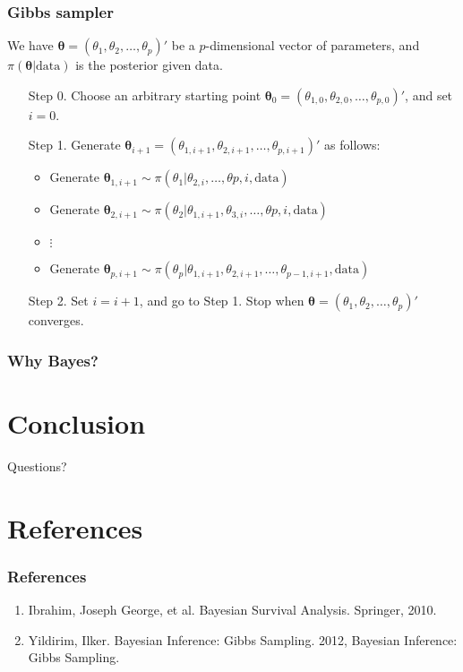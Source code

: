 \documentclass{beamer}
\begin{document}
\begin{frame}
\frametitle{Gibbs sampler}
We have $\pmb{\theta} = (\theta_1, \theta_2, \ldots, \theta_p)'$ be a $p$-dimensional vector of parameters, and $\pi(\pmb{\theta}|\text{data})$ is the posterior given data. 
\begin{enumerate}
\item[Step 0.] Choose an arbitrary starting point $\pmb{\theta}_{0} = (\theta_{1,0}, \theta_{2,0}, \ldots, \theta_{p,0})'$, and set $i = 0$.
\item [Step 1.] Generate $\pmb{\theta}_{i+1} = (\theta_{1,i+1}, \theta_{2,i+1}, \ldots, \theta_{p,i+1})'$ as follows:
	\begin{itemize}
	\item Generate $\pmb{\theta}_{1,i+1} \sim \pi(\theta_1|\theta_{2,i}, \ldots, \theta{p,i},\text{data})$
	\item Generate $\pmb{\theta}_{2,i+1} \sim \pi(\theta_2|\theta_{1,i+1}, \theta_{3,i}, \ldots, \theta{p,i},\text{data})$
	\item $\vdots$
	\item Generate $\pmb{\theta}_{p,i+1} \sim \pi(\theta_p|\theta_{1,i+1}, \theta_{2,i+1}, \ldots, \theta_{p-1,i+1}, \text{data})$
	\end{itemize}
\item [Step 2.] Set $i = i+1$, and go to Step 1.
Stop when $\pmb{\theta} = (\theta_1, \theta_2, \ldots, \theta_p)'$ converges.
\end{enumerate}
\end{frame}

\begin{frame}
\frametitle{Why Bayes?}
\end{frame}

\section{Conclusion}
\begin{frame}
Questions?
\end{frame}

\section{References}
\begin{frame}
\frametitle{References}
\begin{enumerate}
\item Ibrahim, Joseph George, et al. Bayesian Survival Analysis. Springer, 2010.
\item Yildirim, Ilker. Bayesian Inference: Gibbs Sampling. 2012, Bayesian Inference: Gibbs Sampling.
\end{enumerate}
\end{frame}
\end{document}
